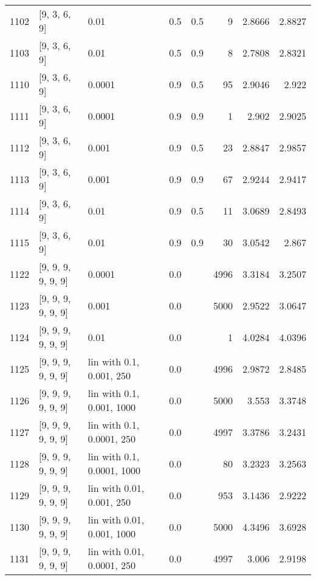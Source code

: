 \begin{longtable}{lllrrrrr}
 1102 &       [9, 3, 6, 9] &                        0.01 &      0.5 & 0.5 &    9 &   2.8666 &   2.8827 \\
 1103 &       [9, 3, 6, 9] &                        0.01 &      0.5 & 0.9 &    8 &   2.7808 &   2.8321 \\
 1110 &       [9, 3, 6, 9] &                      0.0001 &      0.9 & 0.5 &   95 &   2.9046 &    2.922 \\
 1111 &       [9, 3, 6, 9] &                      0.0001 &      0.9 & 0.9 &    1 &    2.902 &   2.9025 \\
 1112 &       [9, 3, 6, 9] &                       0.001 &      0.9 & 0.5 &   23 &   2.8847 &   2.9857 \\
 1113 &       [9, 3, 6, 9] &                       0.001 &      0.9 & 0.9 &   67 &   2.9244 &   2.9417 \\
 1114 &       [9, 3, 6, 9] &                        0.01 &      0.9 & 0.5 &   11 &   3.0689 &   2.8493 \\
 1115 &       [9, 3, 6, 9] &                        0.01 &      0.9 & 0.9 &   30 &   3.0542 &    2.867 \\
 1122 & [9, 9, 9, 9, 9, 9] &                      0.0001 &      0.0 &     & 4996 &   3.3184 &   3.2507 \\
 1123 & [9, 9, 9, 9, 9, 9] &                       0.001 &      0.0 &     & 5000 &   2.9522 &   3.0647 \\
 1124 & [9, 9, 9, 9, 9, 9] &                        0.01 &      0.0 &     &    1 &   4.0284 &   4.0396 \\
 1125 & [9, 9, 9, 9, 9, 9] &    lin with 0.1, 0.001, 250 &      0.0 &     & 4996 &   2.9872 &   2.8485 \\
 1126 & [9, 9, 9, 9, 9, 9] &   lin with 0.1, 0.001, 1000 &      0.0 &     & 5000 &    3.553 &   3.3748 \\
 1127 & [9, 9, 9, 9, 9, 9] &   lin with 0.1, 0.0001, 250 &      0.0 &     & 4997 &   3.3786 &   3.2431 \\
 1128 & [9, 9, 9, 9, 9, 9] &  lin with 0.1, 0.0001, 1000 &      0.0 &     &   80 &   3.2323 &   3.2563 \\
 1129 & [9, 9, 9, 9, 9, 9] &   lin with 0.01, 0.001, 250 &      0.0 &     &  953 &   3.1436 &   2.9222 \\
 1130 & [9, 9, 9, 9, 9, 9] &  lin with 0.01, 0.001, 1000 &      0.0 &     & 5000 &   4.3496 &   3.6928 \\
 1131 & [9, 9, 9, 9, 9, 9] &  lin with 0.01, 0.0001, 250 &      0.0 &     & 4997 &    3.006 &   2.9198 \\

\end{longtable}
